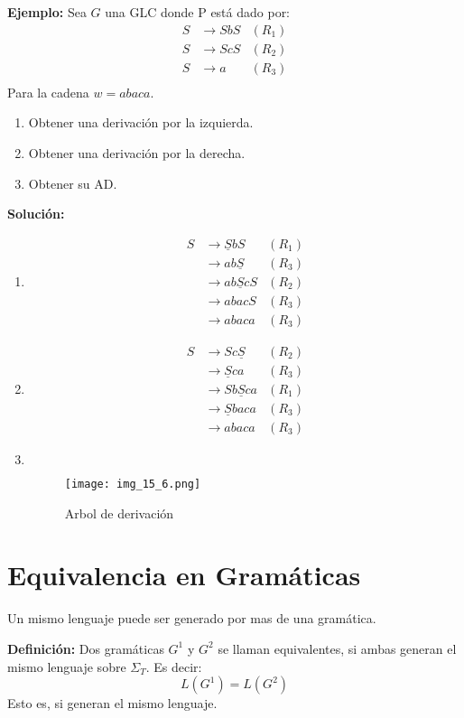 \textbf{Ejemplo: }Sea $G$ una GLC donde P está dado por:
\begin{align*}
S	&\rightarrow SbS	&(R_1)	\\
S	&\rightarrow ScS	&(R_2)	\\
S	&\rightarrow a		&(R_3)	\\
\end{align*}
Para la cadena $w=abaca$.
\begin{enumerate}
\item Obtener una derivación por la izquierda.
\item Obtener una derivación por la derecha.
\item Obtener su AD.
\end{enumerate}
\textbf{Solución: }
\begin{enumerate}
\item 
\begin{align*}
S	&\rightarrow \underline{S}bS	&(R_1)\\
	&\rightarrow ab\underline{S}	&(R_3)\\
	&\rightarrow ab\underline{S}cS	&(R_2)\\
	&\rightarrow abacS				&(R_3)\\
	&\rightarrow abaca				&(R_3)
\end{align*}
\item
\begin{align*}
S	&\rightarrow Sc\underline{S}	&(R_2)\\
	&\rightarrow \underline{S}ca	&(R_3)\\
	&\rightarrow Sb\underline{S}ca	&(R_1)\\
	&\rightarrow \underline{S}baca	&(R_3)\\
	&\rightarrow abaca				&(R_3)
\end{align*}
\item $\,$\\
\begin{figure}[h!]
\centering
\texttt{[image: img\_15\_6.png]}
\caption{Arbol de derivación}\label{img_15_6}
\end{figure}
\end{enumerate}
\section{Equivalencia en Gramáticas}
Un mismo lenguaje puede ser generado por mas de una gramática.

\textbf{Definición: }Dos gramáticas $G^1$ y $G^2$ se llaman equivalentes, si ambas generan el mismo lenguaje sobre $\Sigma_T$. Es decir:
$$L(G^1)=L(G^2)$$
Esto es, si generan el mismo lenguaje.

